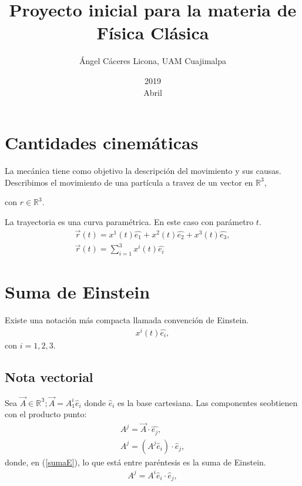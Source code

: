 \documentclass[12pt]{article}
\title{Proyecto inicial para la materia de Física Clásica}
\date{2019\\ Abril}
\author{Ángel Cáceres Licona, UAM Cuajimalpa}
\begin{document}
\maketitle

\section*{Cantidades cinemáticas}

La mecánica tiene como objetivo la descripción del movimiento y sus causas. Describimos el movimiento de una partícula a travez de un vector en $\mathbb{R}^3$, 

\begin{center}
        
\end{center}
con $r \in \mathbb{R}^3$.

La trayectoria es una curva paramétrica. En este caso con parámetro $t$.
\begin{eqnarray}
    \vec{r}(t) = x^1(t)\hat {e_1}+ x^2(t) \hat{e_2} +x^3(t)\hat{e_3},\\
    \vec{r}(t) = \sum_{i=1}^{3}x^i(t)\hat{e_i}
\end{eqnarray}

\section*{Suma de Einstein}
Existe una notación más compacta llamada convención de Einstein.
\begin{eqnarray}
    x^i(t)\hat {e_i},
\end{eqnarray}
con $i=1,2,3$.

\subsection{Nota vectorial}
Sea $\vec{A} \in \mathbb{R^3}; \vec{A}=A_1^i\hat{e}_i$ donde $\hat{e}_i$ es la base cartesiana. Las componentes seobtienen con el producto punto:
\begin{eqnarray}
    A^j=\vec{A}\cdot\hat{e_j},\\
    A^j=(A^j\hat{e}_i)\cdot\hat{e}_j,\label{sumaE}
\end{eqnarray}
donde, en (\ref{sumaE}), lo que está entre paréntesis es la suma de Einstein.
\begin{eqnarray}
    A^j=A^i\hat{e}_i\cdot\hat{e}_j,
\end{eqnarray}
\end{document}
